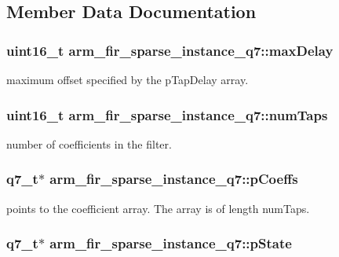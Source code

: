 \subsection{Member Data Documentation}
\hypertarget{structarm__fir__sparse__instance__q7_af74dacc1d34c078283e50f2530eb91df}{
\subsubsection[{max\-Delay}]{\setlength{\rightskip}{0pt plus 5cm}uint16\-\_\-t arm\-\_\-fir\-\_\-sparse\-\_\-instance\-\_\-q7\-::max\-Delay}}\label{structarm__fir__sparse__instance__q7_af74dacc1d34c078283e50f2530eb91df}
maximum offset specified by the p\-Tap\-Delay array. \hypertarget{structarm__fir__sparse__instance__q7_a54cdd27ca1c672b126c38763ce678b1c}{
\subsubsection[{num\-Taps}]{\setlength{\rightskip}{0pt plus 5cm}uint16\-\_\-t arm\-\_\-fir\-\_\-sparse\-\_\-instance\-\_\-q7\-::num\-Taps}}\label{structarm__fir__sparse__instance__q7_a54cdd27ca1c672b126c38763ce678b1c}
number of coefficients in the filter. \hypertarget{structarm__fir__sparse__instance__q7_a3dac86f15e33553e8f3e19e0d712bae5}{
\subsubsection[{p\-Coeffs}]{\setlength{\rightskip}{0pt plus 5cm}q7\-\_\-t$\ast$ arm\-\_\-fir\-\_\-sparse\-\_\-instance\-\_\-q7\-::p\-Coeffs}}\label{structarm__fir__sparse__instance__q7_a3dac86f15e33553e8f3e19e0d712bae5}
points to the coefficient array. The array is of length num\-Taps. \hypertarget{structarm__fir__sparse__instance__q7_a18072cf3ef3666d588f0d49512f2b28f}{
\subsubsection[{p\-State}]{\setlength{\rightskip}{0pt plus 5cm}q7\-\_\-t$\ast$ arm\-\_\-fir\-\_\-sparse\-\_\-instance\-\_\-q7\-::p\-State}}\label{structarm__fir__sparse__instance__q7_a18072cf3ef3666d588f0d49512f2b28f}
